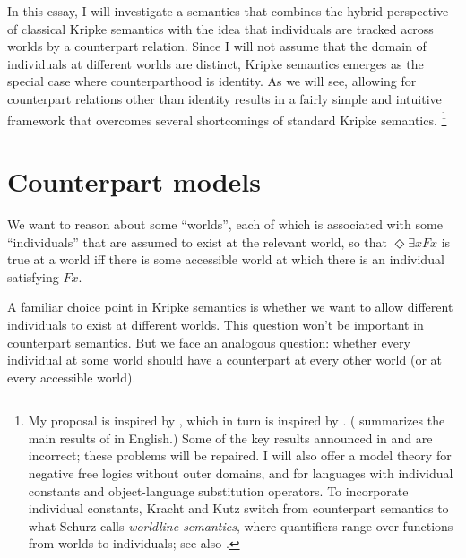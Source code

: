 \documentclass[11pt]{woarticle}
\newcommand{\cmnt}[1]{\iffalse #1 \fi}
\theoremstyle{break}
\theoremstyle{nonumberplain}
\newcommand{\1}{\;\,|\;\,}
\begin{document}
In this essay, I will investigate a semantics that combines the hybrid
perspective of classical Kripke semantics with the idea that individuals are
tracked across worlds by a counterpart relation. Since I will not assume that
the domain of individuals at different worlds are distinct, Kripke semantics
emerges as the special case where counterparthood is identity. As we will see,
allowing for counterpart relations other than identity results in a fairly
simple and intuitive framework that overcomes several shortcomings of standard
Kripke semantics.%
\footnote{%
  My proposal is inspired by \cite{kutz00kripke}, which in turn is inspired by
  \cite{skvortsov93maximal}. (\cite{kracht02semantics} summarizes the main
  results of \cite{kutz00kripke} in English.) Some of the key results announced
  in \cite{kutz00kripke} and \cite{kracht02semantics} are incorrect; these
  problems will be repaired. I will also offer a model theory for negative free
  logics without outer domains, and for languages with individual constants and
  object-language substitution operators. To incorporate individual constants,
  Kracht and Kutz  switch from counterpart semantics to
  what Schurz  calls \emph{worldline semantics},
  where quantifiers range over functions from worlds to individuals; see also
  \cite{kracht07logically}.%
} %

\cmnt{%
  The basic idea of counterpart semantics can also be motivated more abstractly,
  by the fact that it takes into account cross-world relations between
  individuals. Consider a temporal application, where the ``worlds'' are moments
  in time. An individual at one time may be an ancestor, or a cause, or an
  inspiration of an individual at a later time. Such relations connecting
  individuals from different worlds are nowhere to be found in a Kripke model.
  In counterpart semantics, they can be represented as counterpart relations.%
} %


\section{Counterpart models}\label{sec:models}

We want to reason about some ``worlds'', each of which is associated with some
``individuals'' that are assumed to exist at the relevant world, so that
$\Diamond \exists x Fx$ is true at a world iff there is some accessible world at
which there is an individual satisfying $Fx$.

A familiar choice point in Kripke semantics is whether we want to allow
different individuals to exist at different worlds. This question won't be
important in counterpart semantics. But we face an analogous question: whether
every individual at some world should have a counterpart at every other world
(or at every accessible world).
\end{document}
